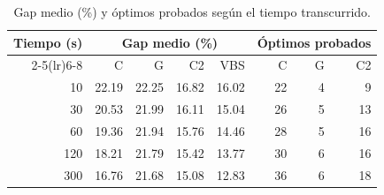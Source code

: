 \begin{table}[H]
  \centering
  \small
  \singlespacing
  \caption{Gap medio (\%) y óptimos probados según el tiempo transcurrido.}
  \label{tab:anytime}
  \begin{tabular}{rrrrrrrr}
    \toprule
    Tiempo (s) & \multicolumn{4}{c}{Gap medio (\%)} & \multicolumn{3}{c}{Óptimos probados} \\
    \cmidrule(lr){2-5}\cmidrule(lr){6-8}
     & C & G & C2 & VBS & C & G & C2 \\
    \midrule
    10 & 22.19 & 22.25 & 16.82 & 16.02 & 22 & 4 & 9 \\
    30 & 20.53 & 21.99 & 16.11 & 15.04 & 26 & 5 & 13 \\
    60 & 19.36 & 21.94 & 15.76 & 14.46 & 28 & 5 & 16 \\
    120 & 18.21 & 21.79 & 15.42 & 13.77 & 30 & 6 & 16 \\
    300 & 16.76 & 21.68 & 15.08 & 12.83 & 36 & 6 & 18 \\
    \bottomrule
  \end{tabular}
  \par\vspace{2pt}{\footnotesize C: Chuffed; G: Gecode; C2: Chuffed V2.}
\end{table}
